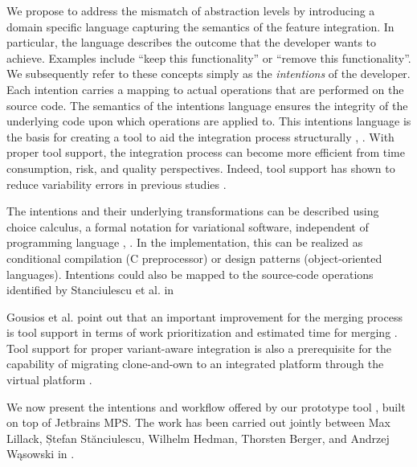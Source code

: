 We propose to address the mismatch of abstraction levels by introducing a domain specific language capturing the semantics of the feature integration. In particular, the language describes the outcome that the developer wants to achieve. Examples include ``keep this functionality'' or ``remove this functionality''. We subsequently refer to these concepts simply as the \textit{intentions} of the developer. Each intention carries a mapping to actual operations that are performed on the source code. The semantics of the intentions language ensures the integrity of the underlying code upon which operations are applied to. This intentions language is the basis for creating a tool to aid the integration process structurally \cite{mens2002}, \cite{apel2011}. With proper tool support, the integration process can become more efficient from time consumption, risk, and quality perspectives. Indeed, tool support has shown to reduce variability errors in previous studies \cite{ribeiro2014emergent}.

The intentions and their underlying transformations can be described using choice calculus, a formal notation for variational software, independent of programming language \cite{erwig2011choice}, \cite{walkingshaw2012choice}. In the implementation, this can be realized as conditional compilation (C preprocessor) or design patterns (object-oriented languages). Intentions could also be mapped to the source-code operations identified by Stanciulescu et al. in \cite{stanciulescu2016concepts}

Gousios et al. point out that an important improvement for the merging process is tool support in terms of work prioritization and estimated time for merging \cite{gousios2015}. Tool support for proper variant-aware integration is also a prerequisite for the capability of migrating clone-and-own to an integrated platform through the virtual platform \cite{antkiewicz2014flexible}.

We now present the intentions and workflow offered by our prototype tool \tooln, built on top of Jetbrains MPS. The work has been carried out jointly between Max Lillack, Ștefan St\u{a}nciulescu, Wilhelm Hedman, Thorsten Berger, and Andrzej W\k{a}sowski in \cite{lillack2017intentions}.

